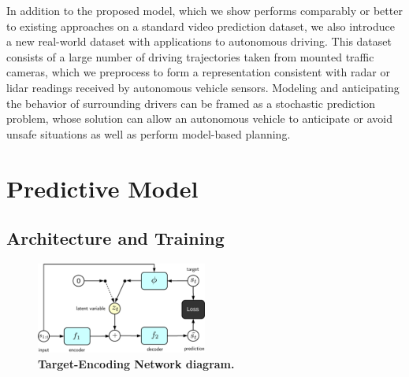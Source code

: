 \documentclass{article}
\begin{document}
In addition to the proposed model, which we show performs comparably or better to existing approaches on a standard video prediction dataset, we also introduce a new real-world dataset with applications to autonomous driving.
This dataset consists of a large number of driving trajectories taken from mounted traffic cameras, which we preprocess to form a representation consistent with radar or lidar readings received by autonomous vehicle sensors.
Modeling and anticipating the behavior of surrounding drivers can be framed as a stochastic prediction problem, whose solution can allow an autonomous vehicle to anticipate or avoid unsafe situations as well as perform model-based planning.


\section{Predictive Model}

\subsection{Architecture and Training}

\begin{figure}
  \centering
  \includegraphics[width=0.5\textwidth]{images/ae_train-crop.pdf}
  \caption{
    \textbf{Target-Encoding Network diagram.}
  }
\end{figure}
\end{document}
